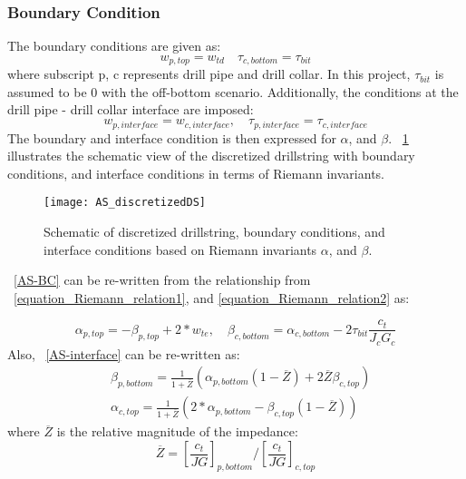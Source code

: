 \subsubsection{Boundary Condition}
The boundary conditions are given as:
\begin{equation}\label{AS-BC}
  w_{p,top} = w_{td} \quad \tau_{c,bottom} = \tau_{bit}
\end{equation}
where subscript p, c represents drill pipe and drill collar. In this project, $\tau_{bit}$ is assumed to be 0 with the off-bottom scenario. 
Additionally, the conditions at the drill pipe - drill collar interface are imposed:
\begin{equation}\label{AS-interface}
  w_{p,interface} = w_{c,interface}, \quad \tau_{p,interface} = \tau_{c,interface}
\end{equation}
The boundary and interface condition is then expressed for $\alpha$, and $\beta$. \figurename~\ref{AS_discretizeDS} illustrates the schematic view of the discretized drillstring with boundary conditions, and interface conditions in terms of Riemann invariants.
\begin{figure}
  \centering
  \texttt{[image: AS\_discretizedDS]}
  \caption[Schematic of discretized drillstring and boundary conditions]{Schematic of discretized drillstring, boundary conditions, and interface conditions based on Riemann invariants $\alpha$, and $\beta$.}\label{AS_discretizeDS}
\end{figure}

\equationname~\ref{AS-BC} can be re-written from the relationship from \equationname~\ref{equation_Riemann_relation1}, and \ref{equation_Riemann_relation2} as:

\begin{equation}\label{AS-riemannBC}
  \alpha_{p,top} = -\beta_{p,top} + 2*w_{te}, \quad \beta_{c,bottom} = \alpha_{c,bottom} - 2\tau_{bit} \frac{c_t}{J_c G_c}
\end{equation}
Also, \equationname~\ref{AS-interface} can be re-written as:
\begin{equation}\label{AS-riemanninterface}
\begin{split}
    & \beta_{p,bottom} = \frac{1}{1+\overline{Z}}\left(\alpha_{p,bottom}(1-\overline{Z}) + 2\overline{Z}\beta_{c,top} \right) \\
    & \alpha_{c,top} = \frac{1}{1+\overline{Z}}\left(2*\alpha_{p,bottom} - \beta_{c,top}(1-\overline{Z})\right)
\end{split}
\end{equation}
where $\overline{Z}$ is the relative magnitude of the impedance:
\begin{equation}\label{AS_Zbar}
  \overline{Z} = \left[\frac{c_t}{JG}\right]_{p,bottom} / \left[\frac{c_t}{JG}\right]_{c,top}
\end{equation}

